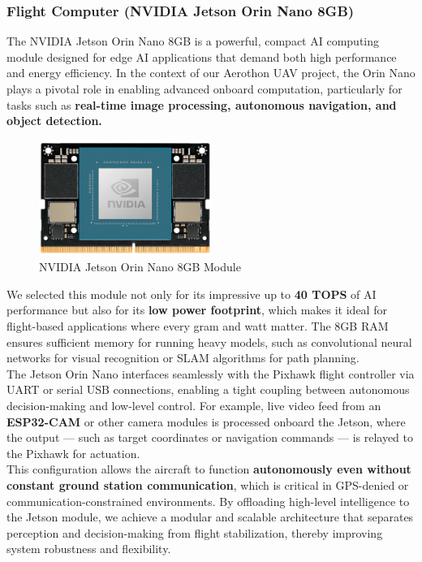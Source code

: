 \documentclass[12pt]{report}
\begin{document}
      \subsubsection{\large Flight Computer (NVIDIA Jetson Orin Nano 8GB)}
      The NVIDIA Jetson Orin Nano 8GB is a powerful, compact AI computing module designed for edge AI applications that demand both high performance and energy efficiency. In the context of our Aerothon UAV project, the Orin Nano plays a pivotal role in enabling advanced onboard computation, particularly for tasks such as \textbf{real-time image processing, autonomous navigation, and object detection.} \\

      \begin{figure}[H]
        \centering 
        \includegraphics[width=0.5\textwidth]{jetson.png}
        \caption{NVIDIA Jetson Orin Nano 8GB Module}
        \label{fig:jetson}
      \end{figure}

      We selected this module not only for its impressive up to \textbf{40 TOPS} of AI performance but also for its \textbf{low power footprint}, which makes it ideal for flight-based applications where every gram and watt matter. The 8GB RAM ensures sufficient memory for running heavy models, such as convolutional neural networks for visual recognition or SLAM algorithms for path planning. \\

      The Jetson Orin Nano interfaces seamlessly with the Pixhawk flight controller via UART or serial USB connections, enabling a tight coupling between autonomous decision-making and low-level control. For example, live video feed from an \textbf{ESP32-CAM} or other camera modules is processed onboard the Jetson, where the output — such as target coordinates or navigation commands — is relayed to the Pixhawk for actuation. \\

      This configuration allows the aircraft to function \textbf{autonomously even without constant ground station communication}, which is critical in GPS-denied or communication-constrained environments. By offloading high-level intelligence to the Jetson module, we achieve a modular and scalable architecture that separates perception and decision-making from flight stabilization, thereby improving system robustness and flexibility. \\
\end{document}

